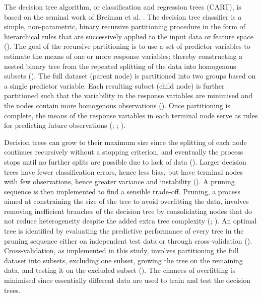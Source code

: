 The decision tree algorithm, or classification and regression trees (CART), is based on the seminal work of Breiman et al. \citeyearpar{breiman_classification_1984}. The decision tree classifier is a simple, non-parametric, binary recursive partitioning procedure in the form of hierarchical rules that are successively applied to the input data or feature space (\cite{strobl_introduction_2009}). The goal of the recursive partitioning is to use a set of predictor variables to estimate the means of one or more response variables; thereby constructing a nested binary tree from the repeated splitting of the data into homogenous subsets (\cite{michaelsen_regression_1994}). The full dataset (parent node) is partitioned into two groups based on a single predictor variable. Each resulting subset (child node) is further partitioned such that the variability in the response variables are minimised and the nodes contain more homogenous observations (\cite{berk_classification_2008}). Once partitioning is complete, the means of the response variables in each terminal node serve as rules for predicting future observations (\cite{michaelsen_regression_1994}; \cite{berk_classification_2008}; \cite{strobl_introduction_2009}).

Decision trees can grow to their maximum size since the splitting of each node continues recursively without a stopping criterion, and eventually the process stops until no further splits are possible due to lack of data (\cite{wu_top_2009}). Larger decision trees have fewer classification errors, hence less bias, but have terminal nodes with few observations, hence greater variance and instability (\cite{berk_classification_2008}). A pruning sequence is then implemented to find a sensible trade-off. Pruning, a process aimed at constraining the size of the tree to avoid overfitting the data, involves removing inefficient branches of the decision tree by consolidating nodes that do not reduce heterogeneity despite the added extra tree complexity (\cite{berk_classification_2008}; \cite{strobl_introduction_2009}). An optimal tree is identified by evaluating the predictive performance of every tree in the pruning sequence either on independent test data or through cross-validation (\cite{wu_top_2009}). Cross-validation, as implemented in this study, involves partitioning the full dataset into subsets, excluding one subset, growing the tree on the remaining data, and testing it on the excluded subset (\cite{michaelsen_regression_1994}). The chances of overfitting is minimised since essentially different data are used to train and test the decision trees.

